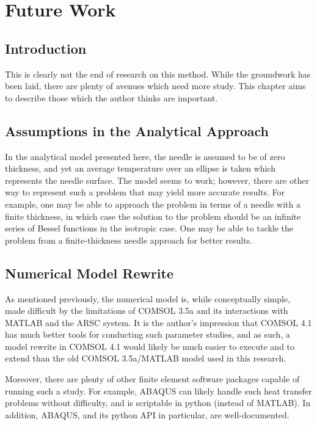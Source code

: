 \chapter{Future Work}

\section{Introduction}

This is clearly not the end of research on this method. While the groundwork has
been laid, there are plenty of avenues which need more study. This chapter aims
to describe those which the author thinks are important.

\section{Assumptions in the Analytical Approach}

In the analytical model presented here, the needle is assumed to be of zero
thickness, and yet an average temperature over an ellipse is taken which
represents the needle surface.  The model seems to work; however, there are
other way to represent such a problem that may yield more accurate results. For
example, one may be able to approach the problem in terms of a needle with a
finite thickness, in which case the solution to the problem should be an
infinite series of Bessel functions in the isotropic case. One may be able to
tackle the problem from a finite-thickness needle approach for better results.

\section{Numerical Model Rewrite}

As mentioned previously, the numerical model is, while conceptually simple, made
difficult by the limitations of COMSOL 3.5a and its interactions with MATLAB and
the ARSC system.  It is the author's impression that COMSOL 4.1 has much better
tools for conducting such parameter studies, and as such, a model rewrite in
COMSOL 4.1 would likely be much easier to execute and to extend than the old
COMSOL 3.5a/MATLAB model used in this research.

Moreover, there are plenty of other finite element software packages capable of
running such a study. For example, ABAQUS can likely handle such heat transfer
problems without difficulty, and is scriptable in python (instead of MATLAB).
In addition, ABAQUS, and its python API in particular, are well-documented.

